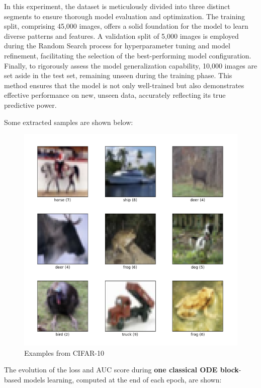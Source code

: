 \documentclass[12pt,a4paper]{report}
\begin{document}
In this experiment, the dataset is meticulously divided into three distinct segments to ensure thorough model evaluation and optimization. The training split, comprising 45,000 images, offers a solid foundation for the model to learn diverse patterns and features. A validation split of 5,000 images is employed during the Random Search process for hyperparameter tuning and model refinement, facilitating the selection of the best-performing model configuration. Finally, to rigorously assess the model generalization capability, 10,000 images are set aside in the test set, remaining unseen during the training phase. This method ensures that the model is not only well-trained but also demonstrates effective performance on new, unseen data, accurately reflecting its true predictive power.

Some extracted samples are shown below:

\begin{figure}[th]
  \centering
  \includegraphics[scale=0.65]{./pics/cifar10.png}
  \caption[Examples from CIFAR-10]{Examples from CIFAR-10\protect\footnotemark}
  \label{fig:p28}
\end{figure}

\clearpage

The evolution of the loss and AUC score during \textbf{one classical ODE block}-based models learning, computed at the end of each epoch, are shown:
\end{document}
